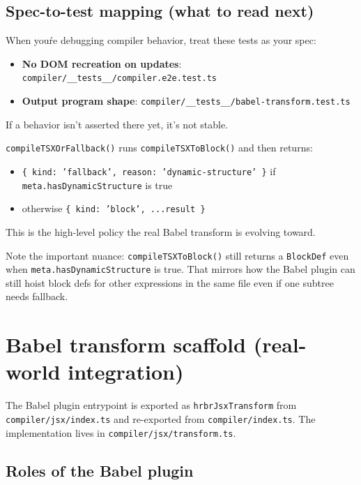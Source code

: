 \subsection*{Spec-to-test mapping (what to read next)}

When you\'re debugging compiler behavior, treat these tests as your spec:

\begin{itemize}
\item \textbf{No DOM recreation on updates}: \texttt{compiler/\_\_tests\_\_/compiler.e2e.test.ts}
\item \textbf{Output program shape}: \texttt{compiler/\_\_tests\_\_/babel-transform.test.ts}
\end{itemize}

If a behavior isn't asserted there yet, it's not stable.

\texttt{compileTSXOrFallback()} runs \texttt{compileTSXToBlock()} and then returns:

\begin{itemize}
\item \texttt{\{ kind: 'fallback', reason: 'dynamic-structure' \}} if \texttt{meta.hasDynamicStructure} is true
\item otherwise \texttt{\{ kind: 'block', ...result \}}
\end{itemize}

This is the high-level policy the real Babel transform is evolving toward.

Note the important nuance: \texttt{compileTSXToBlock()} still returns a \texttt{BlockDef} even when \texttt{meta.hasDynamicStructure} is true. That mirrors how the Babel plugin can still hoist block defs for other expressions in the same file even if one subtree needs fallback.

\section{Babel transform scaffold (real-world integration)}

The Babel plugin entrypoint is exported as \texttt{hrbrJsxTransform} from \texttt{compiler/jsx/index.ts} and re-exported from \texttt{compiler/index.ts}.
The implementation lives in \texttt{compiler/jsx/transform.ts}.

\subsection{Roles of the Babel plugin}

